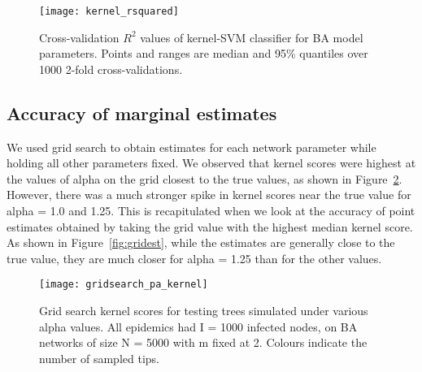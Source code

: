 \begin{figure}[ht]
  \centering
  \texttt{[image: kernel\_rsquared]}
  \caption[Cross-validation accuracy of kSVM classifiers for \gls{BA}
  model parameters.]{Cross-validation $R^2$ values of kernel-SVM classifier for
    \gls{BA} model parameters. Points and ranges are median and 95\% quantiles
    over 1000 2-fold cross-validations.}
  \label{fig:rsquared}
\end{figure}



\subsection{Accuracy of marginal estimates}

We used grid search to obtain  estimates for each network
parameter while holding all other parameters fixed. We observed that kernel
scores were highest at the values of \gls{alpha} on the grid closest to the
true values, as shown in Figure~\ref{fig:gridkernel}. However, there was a much
stronger spike in kernel scores near the true value for \gls{alpha} = 1.0 and
1.25. This is recapitulated when we look at the accuracy of point estimates
obtained by taking the grid value with the highest median kernel score. As
shown in Figure~\ref{fig:gridest}, while the estimates are generally close to
the true value, they are much closer for \gls{alpha} = 1.25 than for the other
values.

\begin{figure}[ht]
  \centering
  \texttt{[image: gridsearch\_pa\_kernel]}
  \caption[Grid search kernel scores]{
    Grid search kernel scores for testing trees simulated under various
    \gls{alpha} values. All epidemics had \gls{I} = 1000 infected nodes, on
    \gls{BA} networks of size \gls{N} = 5000 with \gls{m} fixed at 2. Colours
    indicate the number of sampled tips.
  }
  \label{fig:gridkernel}
\end{figure}

